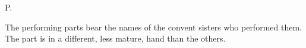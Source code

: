 
\begin{notesources}

\item[P.]

\end{notesources}

The performing parts bear the names of the convent sisters who performed them.
The  part is in a different, less mature, hand than the others.


